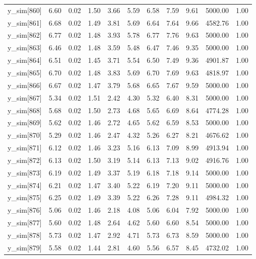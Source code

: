 \begin{table}[ht]
\begin{tabular}{rrrrrrrrrrr}
  y\_sim[860] & 6.60 & 0.02 & 1.50 & 3.66 & 5.59 & 6.58 & 7.59 & 9.61 & 5000.00 & 1.00 \\ 
  y\_sim[861] & 6.68 & 0.02 & 1.49 & 3.81 & 5.69 & 6.64 & 7.64 & 9.66 & 4582.76 & 1.00 \\ 
  y\_sim[862] & 6.77 & 0.02 & 1.48 & 3.93 & 5.78 & 6.77 & 7.76 & 9.63 & 5000.00 & 1.00 \\ 
  y\_sim[863] & 6.46 & 0.02 & 1.48 & 3.59 & 5.48 & 6.47 & 7.46 & 9.35 & 5000.00 & 1.00 \\ 
  y\_sim[864] & 6.51 & 0.02 & 1.45 & 3.71 & 5.54 & 6.50 & 7.49 & 9.36 & 4901.87 & 1.00 \\ 
  y\_sim[865] & 6.70 & 0.02 & 1.48 & 3.83 & 5.69 & 6.70 & 7.69 & 9.63 & 4818.97 & 1.00 \\ 
  y\_sim[866] & 6.67 & 0.02 & 1.47 & 3.79 & 5.68 & 6.65 & 7.67 & 9.59 & 5000.00 & 1.00 \\ 
  y\_sim[867] & 5.34 & 0.02 & 1.51 & 2.42 & 4.30 & 5.32 & 6.40 & 8.31 & 5000.00 & 1.00 \\ 
  y\_sim[868] & 5.68 & 0.02 & 1.50 & 2.73 & 4.68 & 5.65 & 6.69 & 8.64 & 4774.28 & 1.00 \\ 
  y\_sim[869] & 5.62 & 0.02 & 1.46 & 2.72 & 4.65 & 5.62 & 6.59 & 8.53 & 5000.00 & 1.00 \\ 
  y\_sim[870] & 5.29 & 0.02 & 1.46 & 2.47 & 4.32 & 5.26 & 6.27 & 8.21 & 4676.62 & 1.00 \\ 
  y\_sim[871] & 6.12 & 0.02 & 1.46 & 3.23 & 5.16 & 6.13 & 7.09 & 8.99 & 4913.94 & 1.00 \\ 
  y\_sim[872] & 6.13 & 0.02 & 1.50 & 3.19 & 5.14 & 6.13 & 7.13 & 9.02 & 4916.76 & 1.00 \\ 
  y\_sim[873] & 6.19 & 0.02 & 1.49 & 3.37 & 5.19 & 6.18 & 7.18 & 9.14 & 5000.00 & 1.00 \\ 
  y\_sim[874] & 6.21 & 0.02 & 1.47 & 3.40 & 5.22 & 6.19 & 7.20 & 9.11 & 5000.00 & 1.00 \\ 
  y\_sim[875] & 6.25 & 0.02 & 1.49 & 3.39 & 5.22 & 6.26 & 7.28 & 9.11 & 4984.32 & 1.00 \\ 
  y\_sim[876] & 5.06 & 0.02 & 1.46 & 2.18 & 4.08 & 5.06 & 6.04 & 7.92 & 5000.00 & 1.00 \\ 
  y\_sim[877] & 5.60 & 0.02 & 1.48 & 2.64 & 4.62 & 5.60 & 6.60 & 8.54 & 5000.00 & 1.00 \\ 
  y\_sim[878] & 5.73 & 0.02 & 1.47 & 2.92 & 4.71 & 5.73 & 6.73 & 8.59 & 5000.00 & 1.00 \\ 
  y\_sim[879] & 5.58 & 0.02 & 1.44 & 2.81 & 4.60 & 5.56 & 6.57 & 8.45 & 4732.02 & 1.00 \\ 

\end{tabular}
\end{table}
